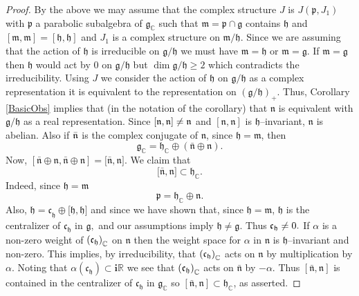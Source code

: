\documentclass[10pt,a4paper]{amsart}
\begin{document}
\begin{proof}
By the above we may assume that the  complex structure $J$ is $J(%
\mathfrak{\mathfrak{p}},J_{1})$ with $\mathfrak{p}$ a parabolic subalgebra
of $\mathfrak{g}_{\mathbb{C}}$ such that $\mathfrak{m}=\mathfrak{p\cap
\mathfrak{g}}$ contains $\mathfrak{h}$ and $[\mathfrak{m},\mathfrak{m}]=[\mathfrak{h},\mathfrak{h}]$
and $J_{1}$ is a complex structure on $\mathfrak{m}/\mathfrak{h}$.
 Since we are assuming that the action of $\mathfrak{h}$ is irreducible on $\mathfrak{g}/\mathfrak{h}$  we must have $\mathfrak{m}=\mathfrak{h}$ or $\mathfrak{m}=\mathfrak{g}.$
If $\mathfrak{m}=\mathfrak{g}$ then $\mathfrak{h}$ would act by $0$ on
$\mathfrak{g}/\mathfrak{h}$ but $\dim \mathfrak{g}/\mathfrak{h}\geq 2$ which
contradicts the irreducibility. Using $J$ we  consider the action of $%
\mathfrak{h}$ on $\mathfrak{g}/\mathfrak{h}$ as a complex representation it
is equivalent to the representation on $\left( \mathfrak{g}/\mathfrak{h}%
\right) _{+}$.  Thus, Corollary \ref{BasicObs}  implies that (in the notation of the
corollary) that $\mathfrak{\mathfrak{n}}$ is equivalent with $\mathfrak{g}/%
\mathfrak{h}$ as a real representation. Since $\left[ \mathfrak{n},\mathfrak{%
n}\right] \neq \mathfrak{n}$ and $\left[ \mathfrak{n},\mathfrak{n}\right] $
is $\mathfrak{h}$--invariant, $\mathfrak{n}$ is abelian. Also if $\mathfrak{%
\bar{n}}$ is the complex conjugate of $\mathfrak{n}$, since $\mathfrak{h}=\mathfrak{m}$, then
\[
\mathfrak{g}_{\mathbb{C}}=\mathfrak{h}_{\mathbb{C}}\oplus \left(\bar{\mathfrak{n}}%
\oplus \mathfrak{n}\right).
\]%
Now, $[\mathfrak{\bar{n}\oplus
\mathfrak{n}},\mathfrak{\bar{n}\oplus \mathfrak{n}}]=[\mathfrak{\bar{n},%
\mathfrak{n].}}$ We claim that
\begin{equation}\label{eq:helpsym}
\lbrack \mathfrak{\bar{n},\mathfrak{n}}]\subset \mathfrak{h}_{\mathbb{C}}%
\mathfrak{.}
\end{equation}
Indeed, since $\mathfrak{h}=\mathfrak{m}$
\[
\mathfrak{p=\mathfrak{h}}_{\mathbb{C}}\oplus \mathfrak{n.}
\]%
Also, $\mathfrak{h=\mathfrak{c}}_{\mathfrak{h}}\oplus \lbrack \mathfrak{h},%
\mathfrak{h]}$ and since we have shown that, since $\mathfrak{h}=\mathfrak{m}$,  $\mathfrak{h}$ is the centralizer
of $\mathfrak{c}_{\mathfrak{h}}$ in $\mathfrak{g,}$ and our assumptions
imply $\mathfrak{h\neq \mathfrak{g.}}$ Thus $\mathfrak{\mathfrak{c}}_{%
\mathfrak{h}}\neq 0.$ If $\alpha $ is a non-zero weight of $\left( \mathfrak{%
c}_{\mathfrak{h}}\right) _{\mathbb{C}}$ on $\mathfrak{n}$ then the weight
space for $\alpha $ in $\mathfrak{n}$ is $\mathfrak{h}$--invariant and
non-zero. This implies, by irreducibility, that $\left( \mathfrak{c}_{%
\mathfrak{h}}\right) _{\mathbb{C}}$ acts on $\mathfrak{n}$ by multiplication
by $\alpha $. Noting that $\alpha (\mathfrak{c}_{\mathfrak{h}})\subset \mathbf{i}%
\mathbb{R}$ we see that $\left( \mathfrak{c}_{\mathfrak{h}}\right) _{\mathbb{%
C}}$ acts on $\mathfrak{\bar{n}}$ by $-\alpha.$ Thus $[\mathfrak{\bar{n},%
\mathfrak{n}}]$ is contained in the centralizer of $\mathfrak{c}_{\mathfrak{h%
}}$ in $\mathfrak{g}_{\mathbb{C}}$ so $[\mathfrak{\bar{n},\mathfrak{n}}%
]\subset \mathfrak{h}_{\mathbb{C}}$, as asserted.


\end{proof}
\end{document}

